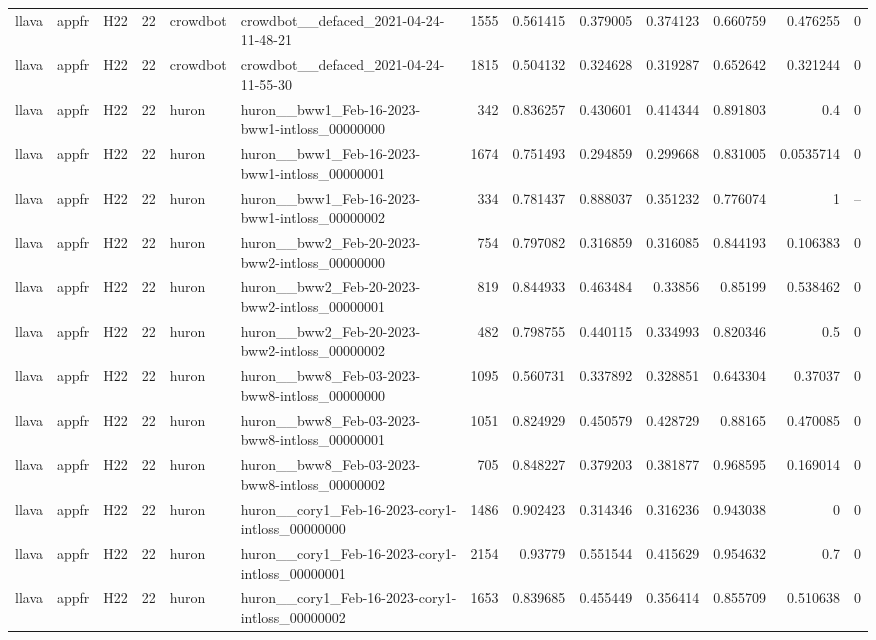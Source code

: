 \begin{longtable}{lllrllrrrrrrr}
llava & appfr & H22 & 22 & crowdbot & crowdbot\_\_defaced\_2021-04-24-11-48-21 & 1555 & 0.561415 & 0.379005 & 0.374123 & 0.660759 & 0.476255 & 0 \\
llava & appfr & H22 & 22 & crowdbot & crowdbot\_\_defaced\_2021-04-24-11-55-30 & 1815 & 0.504132 & 0.324628 & 0.319287 & 0.652642 & 0.321244 & 0 \\
llava & appfr & H22 & 22 & huron & huron\_\_bww1\_Feb-16-2023-bww1-intloss\_00000000 & 342 & 0.836257 & 0.430601 & 0.414344 & 0.891803 & 0.4 & 0 \\
llava & appfr & H22 & 22 & huron & huron\_\_bww1\_Feb-16-2023-bww1-intloss\_00000001 & 1674 & 0.751493 & 0.294859 & 0.299668 & 0.831005 & 0.0535714 & 0 \\
llava & appfr & H22 & 22 & huron & huron\_\_bww1\_Feb-16-2023-bww1-intloss\_00000002 & 334 & 0.781437 & 0.888037 & 0.351232 & 0.776074 & 1 & -- \\
llava & appfr & H22 & 22 & huron & huron\_\_bww2\_Feb-20-2023-bww2-intloss\_00000000 & 754 & 0.797082 & 0.316859 & 0.316085 & 0.844193 & 0.106383 & 0 \\
llava & appfr & H22 & 22 & huron & huron\_\_bww2\_Feb-20-2023-bww2-intloss\_00000001 & 819 & 0.844933 & 0.463484 & 0.33856 & 0.85199 & 0.538462 & 0 \\
llava & appfr & H22 & 22 & huron & huron\_\_bww2\_Feb-20-2023-bww2-intloss\_00000002 & 482 & 0.798755 & 0.440115 & 0.334993 & 0.820346 & 0.5 & 0 \\
llava & appfr & H22 & 22 & huron & huron\_\_bww8\_Feb-03-2023-bww8-intloss\_00000000 & 1095 & 0.560731 & 0.337892 & 0.328851 & 0.643304 & 0.37037 & 0 \\
llava & appfr & H22 & 22 & huron & huron\_\_bww8\_Feb-03-2023-bww8-intloss\_00000001 & 1051 & 0.824929 & 0.450579 & 0.428729 & 0.88165 & 0.470085 & 0 \\
llava & appfr & H22 & 22 & huron & huron\_\_bww8\_Feb-03-2023-bww8-intloss\_00000002 & 705 & 0.848227 & 0.379203 & 0.381877 & 0.968595 & 0.169014 & 0 \\
llava & appfr & H22 & 22 & huron & huron\_\_cory1\_Feb-16-2023-cory1-intloss\_00000000 & 1486 & 0.902423 & 0.314346 & 0.316236 & 0.943038 & 0 & 0 \\
llava & appfr & H22 & 22 & huron & huron\_\_cory1\_Feb-16-2023-cory1-intloss\_00000001 & 2154 & 0.93779 & 0.551544 & 0.415629 & 0.954632 & 0.7 & 0 \\
llava & appfr & H22 & 22 & huron & huron\_\_cory1\_Feb-16-2023-cory1-intloss\_00000002 & 1653 & 0.839685 & 0.455449 & 0.356414 & 0.855709 & 0.510638 & 0 \\

\end{longtable}
